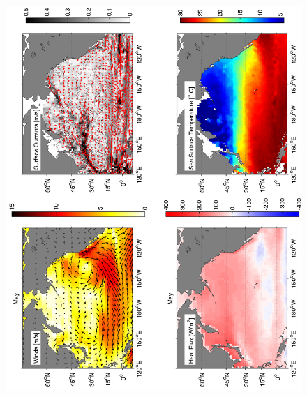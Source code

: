 \begin{figure}[hbt]
  \begin{center}
  \includegraphics[angle=270]{figs/WindOverview/SurfaceCurrents05}
    \caption{}
    \label{fig:}  
  \end{center}
\end{figure}

